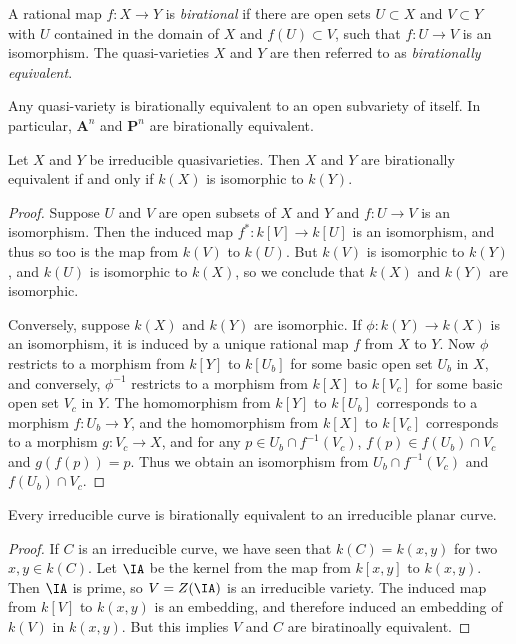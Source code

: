 A rational map $f: X \to Y$ is \emph{birational} if there are open sets $U \subset X$ and $V \subset Y$ with $U$ contained in the domain of $X$ and $f(U) \subset V$, such that $f: U \to V$ is an isomorphism. The quasi-varieties $X$ and $Y$ are then referred to as \emph{birationally equivalent}.

\begin{example}
    Any quasi-variety is birationally equivalent to an open subvariety of itself. In particular, $\mathbf{A}^n$ and $\mathbf{P}^n$ are birationally equivalent.
\end{example}

\begin{theorem}
    Let $X$ and $Y$ be irreducible quasivarieties. Then $X$ and $Y$ are birationally equivalent if and only if $k(X)$ is isomorphic to $k(Y)$.
\end{theorem}
\begin{proof}
    Suppose $U$ and $V$ are open subsets of $X$ and $Y$ and $f: U \to V$ is an isomorphism. Then the induced map $f^*: k[V] \to k[U]$ is an isomorphism, and thus so too is the map from $k(V)$ to $k(U)$. But $k(V)$ is isomorphic to $k(Y)$, and $k(U)$ is isomorphic to $k(X)$, so we conclude that $k(X)$ and $k(Y)$ are isomorphic.

    Conversely, suppose $k(X)$ and $k(Y)$ are isomorphic. If $\phi: k(Y) \to k(X)$ is an isomorphism, it is induced by a unique rational map $f$ from $X$ to $Y$. Now $\phi$ restricts to a morphism from $k[Y]$ to $k[U_b]$ for some basic open set $U_b$ in $X$, and conversely, $\phi^{-1}$ restricts to a morphism from $k[X]$ to $k[V_c]$ for some basic open set $V_c$ in $Y$. The homomorphism from $k[Y]$ to $k[U_b]$ corresponds to a morphism $f: U_b \to Y$, and the homomorphism from $k[X]$ to $k[V_c]$ corresponds to a morphism $g: V_c \to X$, and for any $p \in U_b \cap f^{-1}(V_c)$, $f(p) \in f(U_b) \cap V_c$ and $g(f(p)) = p$. Thus we obtain an isomorphism from $U_b \cap f^{-1}(V_c)$ and $f(U_b) \cap V_c$.
\end{proof}

\begin{corollary}
    Every irreducible curve is birationally equivalent to an irreducible planar curve.
\end{corollary}
\begin{proof}
    If $C$ is an irreducible curve, we have seen that $k(C) = k(x,y)$ for two $x,y \in k(C)$. Let $\IA$ be the kernel from the map from $k[x,y]$ to $k(x,y)$. Then $\IA$ is prime, so $V = Z(\IA)$ is an irreducible variety. The induced map from $k[V]$ to $k(x,y)$ is an embedding, and therefore induced an embedding of $k(V)$ in $k(x,y)$. But this implies $V$ and $C$ are biratinoally equivalent.
\end{proof}

